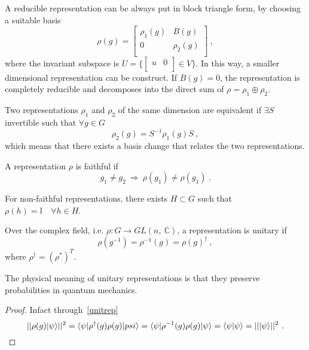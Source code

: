     \noindent A reducible representation can be always put in block triangle form, by choosing a suitable basis 
    \begin{equation*}
        \rho(g) = 
        \begin{bmatrix}
            \rho_1(g) & B(g) \\
            0 & \rho_2(g) \\
        \end{bmatrix} ~,
    \end{equation*}
    where the invariant subspace is $U = \{\begin{bmatrix} u & 0 \\ \end{bmatrix} \in V\}$. In this way, a smaller dimensional representation can be construct. If $B(g)=0$, the representation is completely reducible and decomposes into the direct sum of $\rho = \rho_1 \oplus \rho_2$. 

    \begin{definition}
        Two representations $\rho_1$ and $\rho_2$ of the same dimension are equivalent if $\exists S$ invertible such that $\forall g \in G$
        \begin{equation*}
            \rho_2(g) = S^{-1} \rho_1(g) S ~,
        \end{equation*}
        which means that there exists a basis change that relates the two representations.
    \end{definition}

    \begin{definition}
        A representation $\rho$ is faithful if 
        \begin{equation*}
            g_1 \neq g_2 ~\Rightarrow~ \rho(g_1) \neq \rho(g_1) ~.
        \end{equation*}
    \end{definition}

    For non-faithful representations, there exists $H \subset G$ such that $\rho(h) = \mathbb I \quad \forall h \in H$.

    \begin{definition}
        Over the complex field, i.e. $\rho \colon G \rightarrow GL(n, ~\mathbb C)$, a representation is unitary if 
        \begin{equation}\label{unitrep}
            \rho(g^{-1}) = \rho^{-1}(g) = {\rho(g)}^{\dagger} ~,
        \end{equation}
        where $\rho^\dagger = {(\rho^*)}^T$.
    \end{definition}
    \noindent The physical meaning of unitary representations is that they preserve probabilities in quantum mechanics. 
    \begin{proof}
        Infact through~\eqref{unitrep}
        \begin{equation*}
            ||\rho(g) \vert\psi\rangle||^2 = \langle\psi\vert \rho^\dagger (g) \rho(g) \vert\\psi\rangle = \langle\psi\vert \rho^{-1} (g) \rho(g) \vert\psi\rangle = \langle\psi\vert\psi\rangle = ||\vert\psi\rangle||^2 ~.
        \end{equation*}
    \end{proof}

